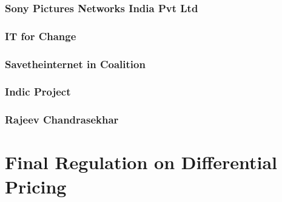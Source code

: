 \documentclass{article}
\begin{document}
\subsubsection{Sony Pictures Networks India Pvt Ltd}


\subsubsection{IT for Change}


\subsubsection{Savetheinternet in Coalition}


\subsubsection{Indic Project}


\subsubsection{Rajeev Chandrasekhar}


\section{Final Regulation on Differential Pricing}


\end{document}
